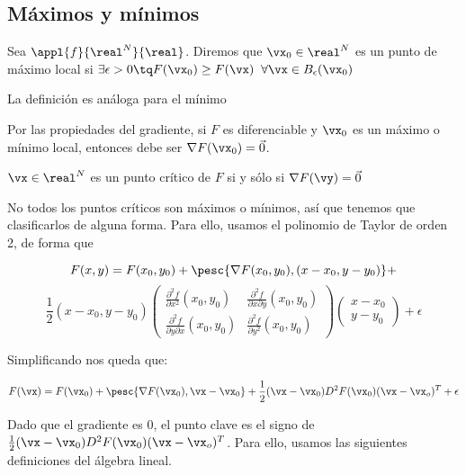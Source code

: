 \subsection{Máximos y mínimos}

\begin{defn} Sea $\appl{f}{\real^N}{\real}$. Diremos que $\vx_0 \in \real^N$ es un punto de máximo local si $\exists \epsilon > 0 \tq F(\vx_0) \geq F(\vx)\;\; \forall \vx \in B_{\epsilon} (\vx_0) $

La definición es análoga para el mínimo\end{defn}

\begin{remark} Por las propiedades del gradiente, si $F$ es diferenciable y $\vx_0$ es un máximo o mínimo local, entonces debe ser $\nabla F(\vx_0) = \vec{0}$.\end{remark}

\begin{defn} $\vx \in \real^N$ es un punto crítico de $F$ si y sólo si $\nabla F(\vy) = \vec{0}$\end{defn}

No todos los puntos críticos son máximos o mínimos, así que tenemos que clasificarlos de alguna forma. Para ello, usamos el polinomio de Taylor de orden 2, de forma que 

\[F(x,y) = F(x_0, y_0) + \pesc{\nabla F(x_0, y_0), (x-x_0, y-y_0)} +\]\[\frac{1}{2}(x-x_0, y-y_0)\left(\begin{matrix} \frac{\partial^2 f}{∂ x^2} (x_0,y_0) & \frac{\partial^2 f}{\partial x \partial y} (x_0,y_0) 
\\ \frac{\partial^2 f}{\partial y \partial x} (x_0,y_0) & \frac{\partial^2 f}{\partial y^2} (x_0,y_0) \end{matrix}\right) \left(\begin{matrix} x - x_0 \\ y - y_0 \end{matrix}\right) + \epsilon \]

Simplificando nos queda que:

\[F(\vx) = F(\vx_0) + \pesc{\nabla F(\vx_0),\vx - \vx_0} + \frac{1}{2}(\vx - \vx_0) D^2F(\vx_0) (\vx - \vx_o) ^T + \epsilon\]

Dado que el gradiente es 0, el punto clave es el signo de $\frac{1}{2}(\vx - \vx_0) D^2F(\vx_0) (\vx - \vx_o) ^T$. Para ello, usamos las siguientes definiciones del álgebra lineal.

